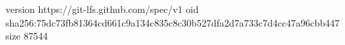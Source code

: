 version https://git-lfs.github.com/spec/v1
oid sha256:75dc73fb81364cd661c9a134c835c8c30b527dfa2d7a733c7d4cc47a96cbb447
size 87544
